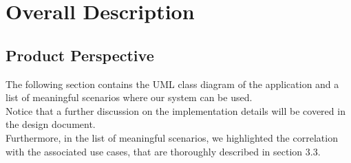 \documentclass[10pt]{report}
\begin{document}
\chapter{Overall Description}
\section{Product Perspective}
The following section contains the UML class diagram of the application and a list of meaningful scenarios where our system can be used.\\ Notice that a further discussion on the implementation details will be covered in the design document.\\ Furthermore, in the list of meaningful scenarios, we highlighted the correlation with the associated use cases, that are thoroughly described in section 3.3.
\end{document}
